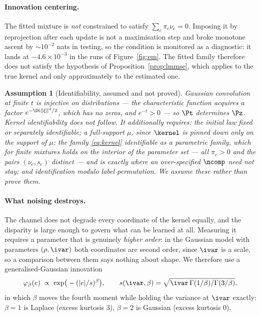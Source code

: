 \documentclass{article}
\newtheorem{assumption}{Assumption}
\begin{document}
\paragraph{Innovation centering.} The fitted mixture is \emph{not} constrained to satisfy
$\sum_c\pi_c\nu_c=0$. Imposing it by reprojection after each update is not a maximisation step
and broke monotone ascent by $\sim10^{-2}$ nats in testing, so the condition is monitored as a
diagnostic: it lands at $-4.6\times10^{-3}$ in the runs of Figure~\ref{fig:em}. The fitted family
therefore does not satisfy the hypothesis of Proposition~\ref{prop:lmmse}, which applies to the
true kernel and only approximately to the estimated one.

\begin{assumption}[Identifiability, assumed and not proved]
\label{ass:ident}
Gaussian convolution at finite $t$ is injective on distributions --- the characteristic function
acquires a factor $e^{-\Dt\|\xi\|^2/2}$, which has no zeros, and $e^{-t}>0$ --- so $\Pt$
determines $\Pz$. \emph{Kernel} identifiability does not follow. It additionally requires: the
initial law fixed or separately identifiable; a full-support $\mu$, since $\kernel$ is pinned
down only on the support of $\mu$; the family \eqref{eq:kernel} identifiable as a parametric
family, which for finite mixtures holds on the interior of the parameter set --- all $\pi_c>0$
and the pairs $(\nu_c,s_c)$ distinct \citep{teicher1963,yakowitz1968} --- and is exactly where an
over-specified $\ncomp$ need not stay; and identification modulo label permutation. We assume
these rather than prove them.
\end{assumption}

\paragraph{What noising destroys.} The channel does not degrade every coordinate of the kernel
equally, and the disparity is large enough to govern what can be learned at all. Measuring it
requires a parameter that is genuinely \emph{higher order}: in the Gaussian model with parameters
$(\rho,\ivar)$ both coordinates are second order, since $\ivar$ is a scale, so a comparison
between them says nothing about shape. We therefore use a generalised-Gaussian innovation
\[
  \varphi_\beta(e)\;\propto\;\exp\!\big(-(|e|/s)^{\beta}\big),
  \qquad s(\ivar,\beta)=\sqrt{\ivar\,\Gamma(1/\beta)/\Gamma(3/\beta)},
\]
in which $\beta$ moves the fourth moment while holding the variance at $\ivar$ exactly:
$\beta=1$ is Laplace (excess kurtosis $3$), $\beta=2$ is Gaussian (excess kurtosis $0$).
\end{document}
